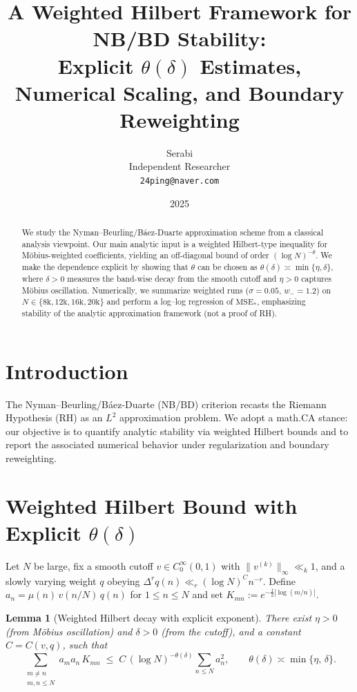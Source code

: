 \documentclass[11pt]{article}
\title{A Weighted Hilbert Framework for NB/BD Stability:\\ Explicit $\theta(\delta)$ Estimates, Numerical Scaling, and Boundary Reweighting}
\author{Serabi \\ Independent Researcher \\ \texttt{24ping@naver.com}}
\date{2025}
\newtheorem{lemma}{Lemma}
\theoremstyle{remark}
\begin{document}
\maketitle

\begin{abstract}
We study the Nyman--Beurling/B\'aez-Duarte approximation scheme from a classical analysis viewpoint.
Our main analytic input is a weighted Hilbert-type inequality for M\"obius-weighted coefficients, yielding an off-diagonal bound of order $(\log N)^{-\theta}$.
We make the dependence explicit by showing that $\theta$ can be chosen as $\theta(\delta)\asymp \min\{\eta,\delta\}$, where $\delta>0$ measures the band-wise decay from the smooth cutoff and $\eta>0$ captures M\"obius oscillation.
Numerically, we summarize weighted runs ($\sigma=0.05$, $w_-=1.2$) on $N\in\{8\mathrm{k},12\mathrm{k},16\mathrm{k},20\mathrm{k}\}$ and perform a log--log regression of $\mathrm{MSE}_\ast$, emphasizing stability of the analytic approximation framework (not a proof of RH).
\end{abstract}

\section{Introduction}
The Nyman--Beurling/B\'aez-Duarte (NB/BD) criterion recasts the Riemann Hypothesis (RH) as an $L^2$ approximation problem.
We adopt a math.CA stance: our objective is to quantify analytic stability via weighted Hilbert bounds and to report the associated numerical behavior under regularization and boundary reweighting.

\section{Weighted Hilbert Bound with Explicit $\theta(\delta)$}
Let $N$ be large, fix a smooth cutoff $v\in C^\infty_0(0,1)$ with $\|v^{(k)}\|_\infty\ll_k 1$, and a slowly varying weight $q$ obeying $\Delta^r q(n) \ll_r (\log N)^C n^{-r}$.
Define $a_n=\mu(n)\,v(n/N)\,q(n)$ for $1\le n\le N$ and set $K_{mn}:=e^{-\tfrac12|\log(m/n)|}$.

\begin{lemma}[Weighted Hilbert decay with explicit exponent]\label{lem:hilbert}
There exist $\eta>0$ (from M\"obius oscillation) and $\delta>0$ (from the cutoff), and a constant $C=C(v,q)$, such that
\begin{equation}\label{eq:offdiag}
\sum_{\substack{m\ne n\\ m,n\le N}} a_m a_n\,K_{mn} \;\le\; C\,(\log N)^{-\theta(\delta)}\sum_{n\le N} a_n^2,
\qquad \theta(\delta)\asymp \min\{\eta,\,\delta\}.
\end{equation}
\end{lemma}
\end{document}
